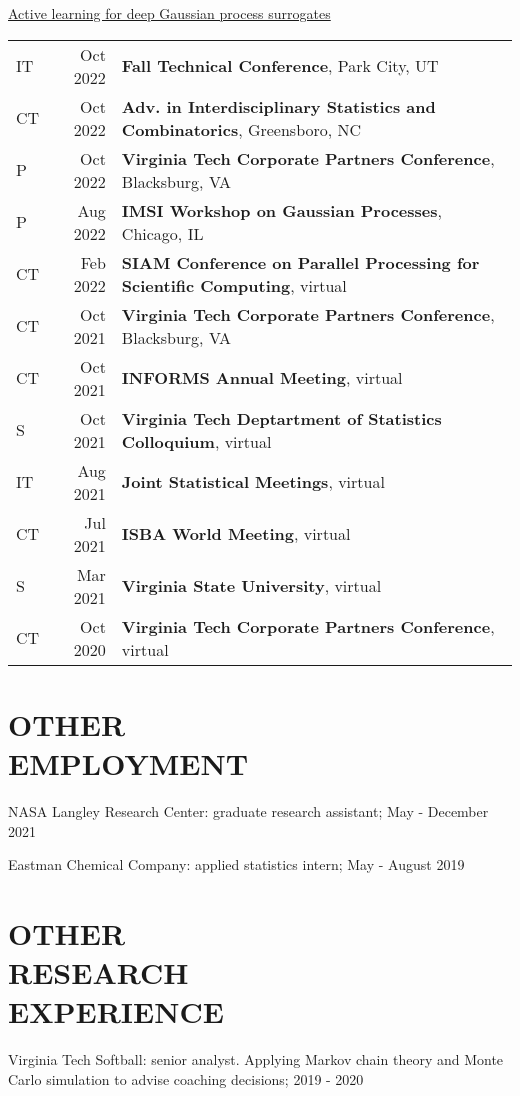\documentclass[margin,line,11pt]{res}
\begin{document}
\begin{resume}
\underline{Active learning for deep Gaussian process surrogates}\\
\begin{tabular}{lrl}
IT & Oct 2022 & {\bf Fall Technical Conference}, Park City, UT \\
CT & Oct 2022 & {\bf Adv. in Interdisciplinary Statistics and Combinatorics}, Greensboro, NC \\
P & Oct 2022 & {\bf Virginia Tech Corporate Partners Conference}, Blacksburg, VA \\
P & Aug 2022 & {\bf IMSI Workshop on Gaussian Processes}, Chicago, IL \\
CT & Feb 2022 & {\bf SIAM Conference on Parallel Processing for Scientific Computing}, virtual \\
CT & Oct 2021 & {\bf Virginia Tech Corporate Partners Conference}, Blacksburg, VA \\
CT & Oct 2021 & {\bf INFORMS Annual Meeting}, virtual \\
S & Oct 2021 & {\bf Virginia Tech Deptartment of Statistics Colloquium}, virtual \\
IT & Aug 2021 & {\bf Joint Statistical Meetings}, virtual \\
CT& Jul 2021 & {\bf ISBA World Meeting}, virtual \\
S & Mar 2021 & {\bf Virginia State University}, virtual \\
CT & Oct 2020 & {\bf Virginia Tech Corporate Partners Conference}, virtual \\
\end{tabular}

\medskip
\section{OTHER \\ EMPLOYMENT}

{\sc NASA Langley Research Center}: graduate research assistant; May - December 2021

{\sc Eastman Chemical Company}: applied statistics intern; May - August 2019

\medskip
\section{OTHER \\ RESEARCH \\EXPERIENCE}

{\sc Virginia Tech Softball}: senior analyst.  Applying Markov chain theory and Monte Carlo simulation to advise coaching decisions; 2019 - 2020


\end{resume}
\end{document}
